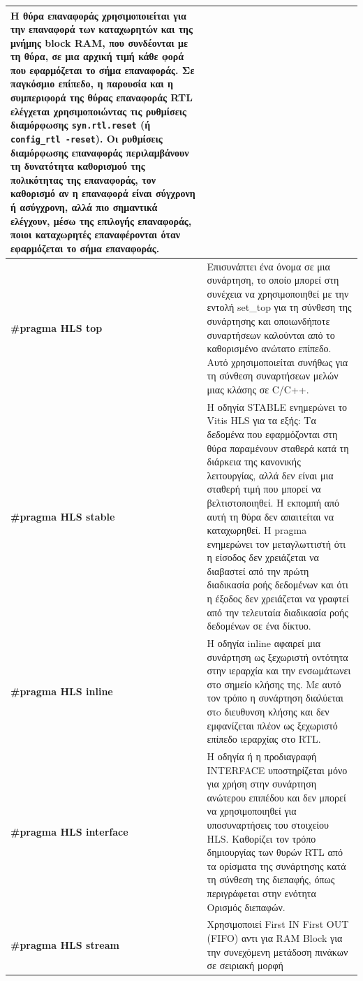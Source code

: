 \begin{longtable}{|p{4cm}|p{10cm}|}
  Η θύρα επαναφοράς χρησιμοποιείται για την επαναφορά των καταχωρητών και της μνήμης block RAM, που συνδέονται με τη θύρα, σε μια αρχική τιμή κάθε φορά που εφαρμόζεται το σήμα επαναφοράς.
  Σε παγκόσμιο επίπεδο, η παρουσία και η συμπεριφορά της θύρας επαναφοράς RTL ελέγχεται χρησιμοποιώντας τις ρυθμίσεις διαμόρφωσης \texttt{syn.rtl.reset} (ή \texttt{config\_rtl -reset}).
  Οι ρυθμίσεις διαμόρφωσης επαναφοράς περιλαμβάνουν τη δυνατότητα καθορισμού της πολικότητας της επαναφοράς, τον καθορισμό αν η επαναφορά είναι σύγχρονη ή ασύγχρονη,
  αλλά πιο σημαντικά ελέγχουν, μέσω της επιλογής επαναφοράς, ποιοι καταχωρητές επαναφέρονται όταν εφαρμόζεται το σήμα επαναφοράς.\\
  \hline
  \textbf{\#pragma HLS top} & Επισυνάπτει ένα όνομα σε μια συνάρτηση, το οποίο μπορεί στη συνέχεια να χρησιμοποιηθεί με την εντολή set\_top για τη σύνθεση της
  συνάρτησης και οποιωνδήποτε συναρτήσεων καλούνται από το καθορισμένο ανώτατο επίπεδο. Αυτό χρησιμοποιείται συνήθως για τη σύνθεση συναρτήσεων μελών μιας κλάσης σε C/C++.\\
  \hline
  \textbf{\#pragma HLS stable} & Η οδηγία STABLE ενημερώνει το Vitis HLS για τα εξής: Τα δεδομένα που εφαρμόζονται στη θύρα παραμένουν σταθερά
  κατά τη διάρκεια της κανονικής λειτουργίας, αλλά δεν είναι μια σταθερή τιμή που μπορεί να βελτιστοποιηθεί.
  Η εκπομπή από αυτή τη θύρα δεν απαιτείται να καταχωρηθεί. Η pragma ενημερώνει τον μεταγλωττιστή ότι η είσοδος δεν χρειάζεται να διαβαστεί από την πρώτη διαδικασία ροής δεδομένων
  και ότι η έξοδος δεν χρειάζεται να γραφτεί από την τελευταία διαδικασία ροής δεδομένων σε ένα δίκτυο.\\
  \hline
  \textbf{\#pragma HLS inline} & Η οδηγία inline αφαιρεί μια συνάρτηση ως ξεχωριστή οντότητα στην ιεραρχία και την ενσωμάτωνει στο σημείο κλήσης της.
  Με αυτό τον τρόπο η συνάρτηση διαλύεται στo διευθυνση κλήσης και δεν εμφανίζεται πλέον ως ξεχωριστό επίπεδο ιεραρχίας στο RTL.\\
  \hline
  \textbf{\#pragma HLS interface} & Η οδηγία ή η προδιαγραφή INTERFACE υποστηρίζεται μόνο για χρήση στην συνάρτηση ανώτερου επιπέδου
  και δεν μπορεί να χρησιμοποιηθεί για υποσυναρτήσεις του στοιχείου HLS. Καθορίζει τον τρόπο δημιουργίας των θυρών RTL από τα ορίσματα της συνάρτησης
  κατά τη σύνθεση της διεπαφής, όπως περιγράφεται στην ενότητα Ορισμός διεπαφών.\\
  \hline
  \textbf{\#pragma HLS stream} & Χρησιμοποιεί First IN First OUT (FIFO) αντι για RAM Block για την συνεχόμενη μετάδοση πινάκων σε σειριακή μορφή\\

\end{longtable}
